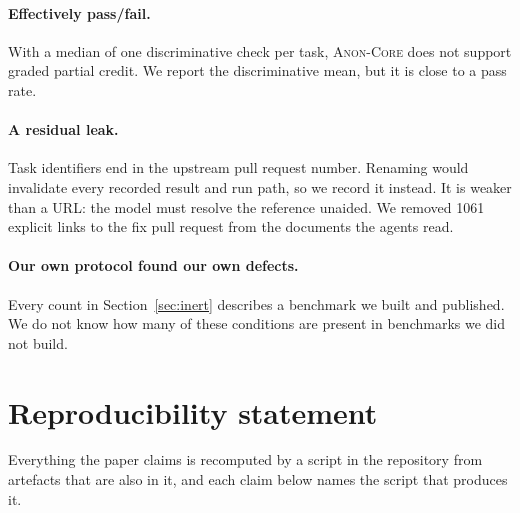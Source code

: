 \documentclass[11pt]{article}
\newcommand{\pth}[1]{\path{#1}}
\newif\ifanon
\newcommand{\core}{\textsc{Anon-Core}}
\newcommand{\core}{\textsc{TeamBench-Core}}
\begin{document}
\paragraph{Effectively pass/fail.} With a median of one discriminative check per
task, \core{} does not support graded partial credit. We report the
discriminative mean, but it is close to a pass rate.

\paragraph{A residual leak.} Task identifiers end in the upstream pull request
number. Renaming would invalidate every recorded result and run path, so we
record it instead. It is weaker than a URL: the model must resolve the reference
unaided. We removed 1061 explicit links to the fix pull request from the
documents the agents read.

\paragraph{Our own protocol found our own defects.} Every count in
Section~\ref{sec:inert} describes a benchmark we built and published. We do not
know how many of these conditions are present in benchmarks we did not build.




\appendix

\section{Reproducibility statement}
\label{app:repro}

\ifanon
\paragraph{Artifact.} Code, the admission ledger, the audit outputs and the run
checkpoints are available to reviewers at \pth{ANONYMIZED-ARTIFACT-URL}, which
carries no author-identifying content. The repository will be released under its
real name on acceptance.
\fi

Everything the paper claims is recomputed by a script in the repository from
artefacts that are also in it, and each claim below names the script that
produces it.
\end{document}
